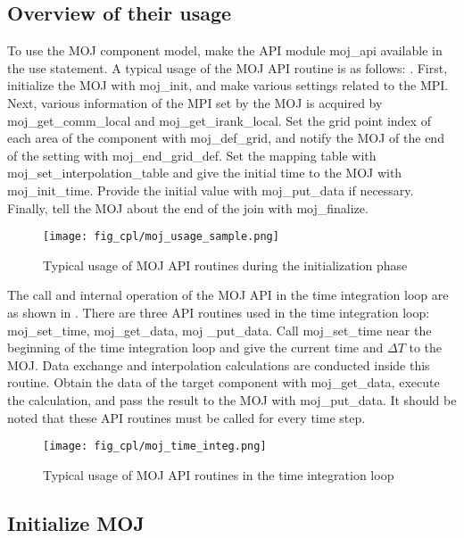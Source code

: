 \hypertarget{overview-of-their-usage}{%
\subsection{Overview of their usage}\label{overview-of-their-usage}}

To use the MOJ component model, make the API module moj\_api available
in the use statement. A typical usage of the MOJ API routine is as
follows: . First, initialize the MOJ with moj\_init, and make various
settings related to the MPI. Next, various information of the MPI set by
the MOJ is acquired by moj\_get\_comm\_local and moj\_get\_irank\_local.
Set the grid point index of each area of the component with
moj\_def\_grid, and notify the MOJ of the end of the setting with
moj\_end\_grid\_def. Set the mapping table with
moj\_set\_interpolation\_table and give the initial time to the MOJ with
moj\_init\_time. Provide the initial value with moj\_put\_data if
necessary. Finally, tell the MOJ about the end of the join with
moj\_finalize.

\begin{figure}
\hypertarget{fig:moj_usage_sample}{%
\centering
\texttt{[image: fig\_cpl/moj\_usage\_sample.png]}
\caption{Typical usage of MOJ API routines during the initialization
phase}\label{fig:moj_usage_sample}
}
\end{figure}

The call and internal operation of the MOJ API in the time integration
loop are as shown in . There are three API routines used in the time
integration loop: moj\_set\_time, moj\_get\_data, moj \_put\_data. Call
moj\_set\_time near the beginning of the time integration loop and give
the current time and \(\Delta{T}\) to the MOJ. Data exchange and
interpolation calculations are conducted inside this routine. Obtain the
data of the target component with moj\_get\_data, execute the
calculation, and pass the result to the MOJ with moj\_put\_data. It
should be noted that these API routines must be called for every time
step.

\begin{figure}
\hypertarget{fig:moj_time_integ}{%
\centering
\texttt{[image: fig\_cpl/moj\_time\_integ.png]}
\caption{Typical usage of MOJ API routines in the time integration
loop}\label{fig:moj_time_integ}
}
\end{figure}

\hypertarget{initialize-moj}{%
\subsection{Initialize MOJ}\label{initialize-moj}}

